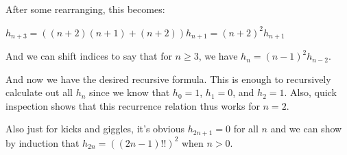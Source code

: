 \documentclass{book}
\newenvironment{myIndent}{%
   \begin{adjustwidth}{2.5em}{0em}%
}{%
   \end{adjustwidth}%
}
\newcommand{\retTwo}{\hfill\bigbreak}
\begin{document}
\begin{enumerate}
\begin{myIndent}
		After some rearranging, this becomes:
		
		{\centering $h_{n+3} = ((n+2)(n+1) + (n+2))h_{n+1} = (n+2)^2h_{n+1}$\retTwo\par}

		And we can shift indices to say that for $n \geq 3$, we have $h_{n} = (n-1)^2 h_{n-2}$.\retTwo

		And now we have the desired recursive formula. This is enough to recursively calculate out all $h_n$ since we know that $h_0 = 1$, $h_1 = 0$, and $h_2 = 1$. Also, quick inspection shows that this recurrence relation thus works for $n = 2$.\retTwo
		
		Also just for kicks and giggles, it's obvious $h_{2n+1} = 0$ for all $n$ and we can show by induction that $h_{2n} = ((2n-1)!!)^2$ when $n > 0$.\retTwo
	\end{myIndent}
\end{enumerate}
\end{document}
